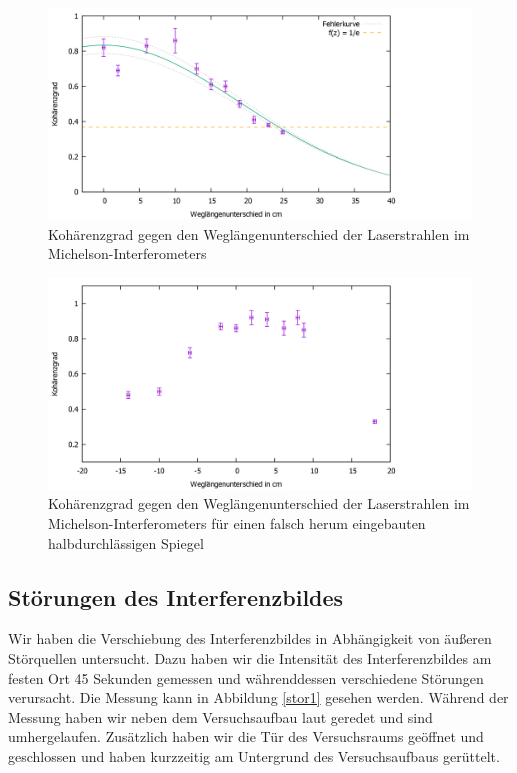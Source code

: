 \documentclass[10pt,a4paper]{article}
\begin{document}
	\begin{figure}[h]
		\centering
		\includegraphics[scale = 0.3]{koplot.png}
		\caption{Kohärenzgrad gegen den Weglängenunterschied der Laserstrahlen im Michelson-Interferometers}
		\label{kopl1}
	\end{figure}
	
		\begin{figure}[h]
			\centering
			\includegraphics[scale = 0.3]{falsches_koplot.png}
			\caption{Kohärenzgrad gegen den Weglängenunterschied der Laserstrahlen im Michelson-Interferometers für einen falsch herum eingebauten halbdurchlässigen Spiegel}
			\label{kopl2}
		\end{figure}

\subsection{Störungen des Interferenzbildes}

Wir haben die Verschiebung des Interferenzbildes in Abhängigkeit von äußeren Störquellen untersucht. Dazu haben wir die Intensität des Interferenzbildes am festen Ort 45 Sekunden gemessen und währenddessen verschiedene Störungen verursacht. Die Messung kann in Abbildung \ref{stor1} gesehen werden. Während der Messung haben wir neben dem Versuchsaufbau laut geredet und sind umhergelaufen. Zusätzlich haben wir die Tür des Versuchsraums geöffnet und geschlossen und haben kurzzeitig am Untergrund des Versuchsaufbaus gerüttelt. 
\end{document}

